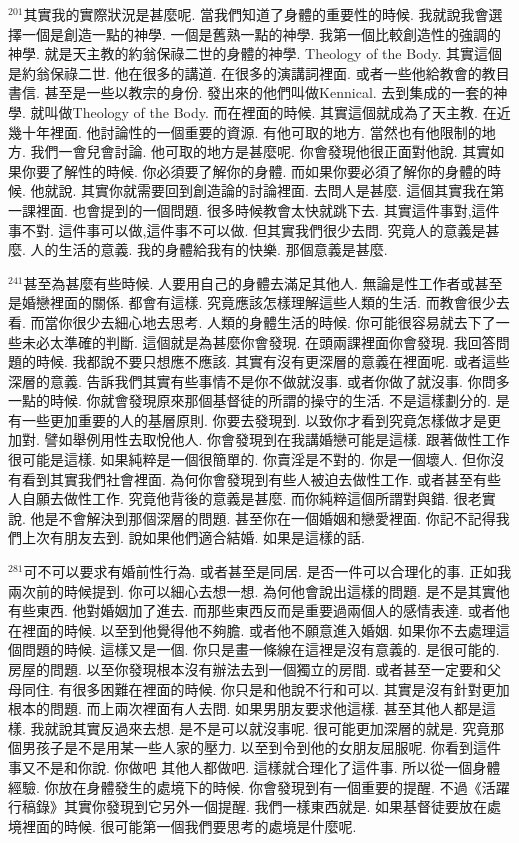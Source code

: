 \documentclass{book}
\begin{document}
$^{201}$其實我的實際狀況是甚麼呢.
當我們知道了身體的重要性的時候.
我就說我會選擇一個是創造一點的神學.
一個是舊熟一點的神學.
我第一個比較創造性的強調的神學.
就是天主教的約翁保祿二世的身體的神學.
Theology of the Body.
其實這個是約翁保祿二世.
他在很多的講道.
在很多的演講詞裡面.
或者一些他給教會的教目書信.
甚至是一些以教宗的身份.
發出來的他們叫做Kennical.
去到集成的一套的神學.
就叫做Theology of the Body.
而在裡面的時候.
其實這個就成為了天主教.
在近幾十年裡面.
他討論性的一個重要的資源.
有他可取的地方.
當然也有他限制的地方.
我們一會兒會討論.
他可取的地方是甚麼呢.
你會發現他很正面對他說.
其實如果你要了解性的時候.
你必須要了解你的身體.
而如果你要必須了解你的身體的時候.
他就說.
其實你就需要回到創造論的討論裡面.
去問人是甚麼.
這個其實我在第一課裡面.
也會提到的一個問題.
很多時候教會太快就跳下去.
其實這件事對,這件事不對.
這件事可以做,這件事不可以做.
但其實我們很少去問.
究竟人的意義是甚麼.
人的生活的意義.
我的身體給我有的快樂.
那個意義是甚麼.

$^{241}$甚至為甚麼有些時候.
人要用自己的身體去滿足其他人.
無論是性工作者或甚至是婚戀裡面的關係.
都會有這樣.
究竟應該怎樣理解這些人類的生活.
而教會很少去看.
而當你很少去細心地去思考.
人類的身體生活的時候.
你可能很容易就去下了一些未必太準確的判斷.
這個就是為甚麼你會發現.
在頭兩課裡面你會發現.
我回答問題的時候.
我都說不要只想應不應該.
其實有沒有更深層的意義在裡面呢.
或者這些深層的意義.
告訴我們其實有些事情不是你不做就沒事.
或者你做了就沒事.
你問多一點的時候.
你就會發現原來那個基督徒的所謂的操守的生活.
不是這樣劃分的.
是有一些更加重要的人的基層原則.
你要去發現到.
以致你才看到究竟怎樣做才是更加對.
譬如舉例用性去取悅他人.
你會發現到在我講婚戀可能是這樣.
跟著做性工作很可能是這樣.
如果純粹是一個很簡單的.
你賣淫是不對的.
你是一個壞人.
但你沒有看到其實我們社會裡面.
為何你會發現到有些人被迫去做性工作.
或者甚至有些人自願去做性工作.
究竟他背後的意義是甚麼.
而你純粹這個所謂對與錯.
很老實說.
他是不會解決到那個深層的問題.
甚至你在一個婚姻和戀愛裡面.
你記不記得我們上次有朋友去到.
說如果他們適合結婚.
如果是這樣的話.

$^{281}$可不可以要求有婚前性行為.
或者甚至是同居.
是否一件可以合理化的事.
正如我兩次前的時候提到.
你可以細心去想一想.
為何他會說出這樣的問題.
是不是其實他有些東西.
他對婚姻加了進去.
而那些東西反而是重要過兩個人的感情表達.
或者他在裡面的時候.
以至到他覺得他不夠膽.
或者他不願意進入婚姻.
如果你不去處理這個問題的時候.
這樣又是一個.
你只是畫一條線在這裡是沒有意義的.
是很可能的.
房屋的問題.
以至你發現根本沒有辦法去到一個獨立的房間.
或者甚至一定要和父母同住.
有很多困難在裡面的時候.
你只是和他說不行和可以.
其實是沒有針對更加根本的問題.
而上兩次裡面有人去問.
如果男朋友要求他這樣.
甚至其他人都是這樣.
我就說其實反過來去想.
是不是可以就沒事呢.
很可能更加深層的就是.
究竟那個男孩子是不是用某一些人家的壓力.
以至到令到他的女朋友屈服呢.
你看到這件事又不是和你說.
你做吧 其他人都做吧.
這樣就合理化了這件事.
所以從一個身體經驗.
你放在身體發生的處境下的時候.
你會發現到有一個重要的提醒.
不過《活躍行稿錄》其實你發現到它另外一個提醒.
我們一樣東西就是.
如果基督徒要放在處境裡面的時候.
很可能第一個我們要思考的處境是什麼呢.
\end{document}
